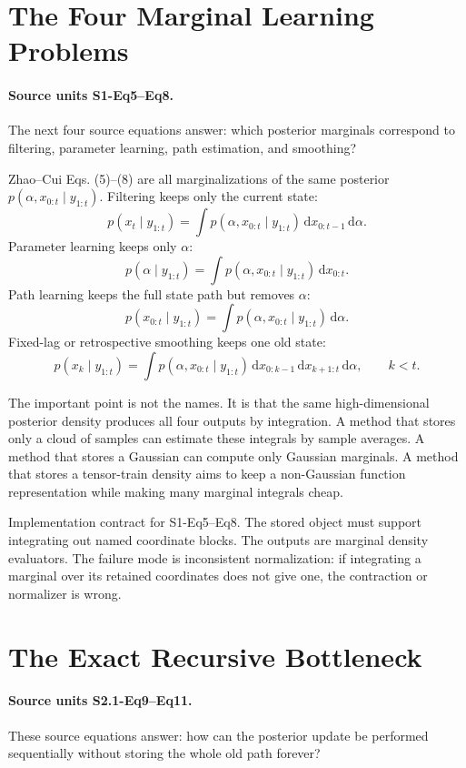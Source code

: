\documentclass[11pt]{article}
\newcommand{\dd}{\,\mathrm d}
\begin{document}
\section{The Four Marginal Learning Problems}

\paragraph{Source units S1-Eq5--Eq8.}
The next four source equations answer: which posterior marginals correspond to
filtering, parameter learning, path estimation, and smoothing?

Zhao--Cui Eqs. (5)--(8) are all marginalizations of the same posterior
\(p(\alpha,x_{0:t}\mid y_{1:t})\).  Filtering keeps only the current state:
\[
    p(x_t\mid y_{1:t})
    =
    \int p(\alpha,x_{0:t}\mid y_{1:t})
    \dd x_{0:t-1}\dd\alpha .
    \tag{BF-5}
\]
Parameter learning keeps only \(\alpha\):
\[
    p(\alpha\mid y_{1:t})
    =
    \int p(\alpha,x_{0:t}\mid y_{1:t})\dd x_{0:t}.
    \tag{BF-6}
\]
Path learning keeps the full state path but removes \(\alpha\):
\[
    p(x_{0:t}\mid y_{1:t})
    =
    \int p(\alpha,x_{0:t}\mid y_{1:t})\dd\alpha .
    \tag{BF-7}
\]
Fixed-lag or retrospective smoothing keeps one old state:
\[
    p(x_k\mid y_{1:t})
    =
    \int p(\alpha,x_{0:t}\mid y_{1:t})
    \dd x_{0:k-1}\dd x_{k+1:t}\dd\alpha ,
    \qquad k<t .
    \tag{BF-8}
\]

The important point is not the names.  It is that the same high-dimensional
posterior density produces all four outputs by integration.  A method that
stores only a cloud of samples can estimate these integrals by sample averages.
A method that stores a Gaussian can compute only Gaussian marginals.  A method
that stores a tensor-train density aims to keep a non-Gaussian function
representation while making many marginal integrals cheap.

Implementation contract for S1-Eq5--Eq8.  The stored object must support
integrating out named coordinate blocks.  The outputs are marginal density
evaluators.  The failure mode is inconsistent normalization: if integrating a
marginal over its retained coordinates does not give one, the contraction or
normalizer is wrong.

\section{The Exact Recursive Bottleneck}

\paragraph{Source units S2.1-Eq9--Eq11.}
These source equations answer: how can the posterior update be performed
sequentially without storing the whole old path forever?
\end{document}
